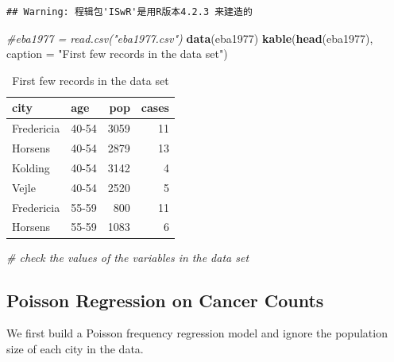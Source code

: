 \documentclass[
]{book}
\newenvironment{Shaded}{\begin{snugshade}}{\end{snugshade}}
\newcommand{\AttributeTok}[1]{\textcolor[rgb]{0.13,0.29,0.53}{#1}}
\newcommand{\CommentTok}[1]{\textcolor[rgb]{0.56,0.35,0.01}{\textit{#1}}}
\newcommand{\DocumentationTok}[1]{\textcolor[rgb]{0.56,0.35,0.01}{\textbf{\textit{#1}}}}
\newcommand{\FunctionTok}[1]{\textcolor[rgb]{0.13,0.29,0.53}{\textbf{#1}}}
\newcommand{\NormalTok}[1]{#1}
\newcommand{\OtherTok}[1]{\textcolor[rgb]{0.56,0.35,0.01}{#1}}
\newcommand{\SpecialCharTok}[1]{\textcolor[rgb]{0.81,0.36,0.00}{\textbf{#1}}}
\newcommand{\StringTok}[1]{\textcolor[rgb]{0.31,0.60,0.02}{#1}}
\begin{document}
\begin{verbatim}
## Warning: 程辑包'ISwR'是用R版本4.2.3 来建造的
\end{verbatim}

\begin{Shaded}
\begin{Highlighting}[]
\CommentTok{\#eba1977 = read.csv("eba1977.csv")}
\FunctionTok{data}\NormalTok{(eba1977)}
\FunctionTok{kable}\NormalTok{(}\FunctionTok{head}\NormalTok{(eba1977), }\AttributeTok{caption =} \StringTok{"First few records in the data set"}\NormalTok{) }
\end{Highlighting}
\end{Shaded}

\begin{table}

\caption{\label{tab:unnamed-chunk-155}First few records in the data set}
\centering
\begin{tabular}[t]{l|l|r|r}
\hline
city & age & pop & cases\\
\hline
Fredericia & 40-54 & 3059 & 11\\
\hline
Horsens & 40-54 & 2879 & 13\\
\hline
Kolding & 40-54 & 3142 & 4\\
\hline
Vejle & 40-54 & 2520 & 5\\
\hline
Fredericia & 55-59 & 800 & 11\\
\hline
Horsens & 55-59 & 1083 & 6\\
\hline
\end{tabular}
\end{table}

\begin{Shaded}
\begin{Highlighting}[]
\CommentTok{\# check the values of the variables in the data set}
\end{Highlighting}
\end{Shaded}

\hypertarget{poisson-regression-on-cancer-counts}{%
\subsection{Poisson Regression on Cancer Counts}\label{poisson-regression-on-cancer-counts}}

We first build a Poisson frequency regression model and ignore the population size of each city in the data.

\begin{Shaded}
\end{Shaded}
\end{document}
